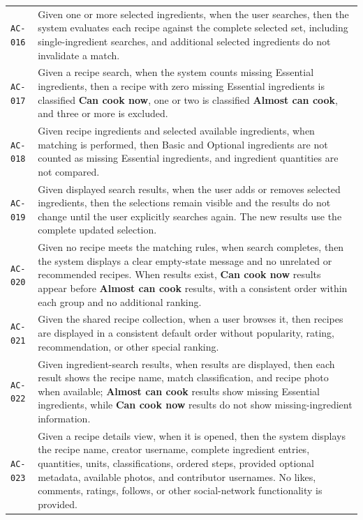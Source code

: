 \documentclass[12pt]{article}
\begin{document}
\begin{longtable}{p{} p{}}
\texttt{AC-016} & Given one or more selected ingredients, when the user searches, then the system evaluates each recipe against the complete selected set, including single-ingredient searches, and additional selected ingredients do not invalidate a match. \\
\texttt{AC-017} & Given a recipe search, when the system counts missing Essential ingredients, then a recipe with zero missing Essential ingredients is classified \textbf{Can cook now}, one or two is classified \textbf{Almost can cook}, and three or more is excluded. \\
\texttt{AC-018} & Given recipe ingredients and selected available ingredients, when matching is performed, then Basic and Optional ingredients are not counted as missing Essential ingredients, and ingredient quantities are not compared. \\
\texttt{AC-019} & Given displayed search results, when the user adds or removes selected ingredients, then the selections remain visible and the results do not change until the user explicitly searches again. The new results use the complete updated selection. \\
\texttt{AC-020} & Given no recipe meets the matching rules, when search completes, then the system displays a clear empty-state message and no unrelated or recommended recipes. When results exist, \textbf{Can cook now} results appear before \textbf{Almost can cook} results, with a consistent order within each group and no additional ranking. \\
\texttt{AC-021} & Given the shared recipe collection, when a user browses it, then recipes are displayed in a consistent default order without popularity, rating, recommendation, or other special ranking. \\
\texttt{AC-022} & Given ingredient-search results, when results are displayed, then each result shows the recipe name, match classification, and recipe photo when available; \textbf{Almost can cook} results show missing Essential ingredients, while \textbf{Can cook now} results do not show missing-ingredient information. \\
\texttt{AC-023} & Given a recipe details view, when it is opened, then the system displays the recipe name, creator username, complete ingredient entries, quantities, units, classifications, ordered steps, provided optional metadata, available photos, and contributor usernames. No likes, comments, ratings, follows, or other social-network functionality is provided. \\

\end{longtable}
\end{document}
